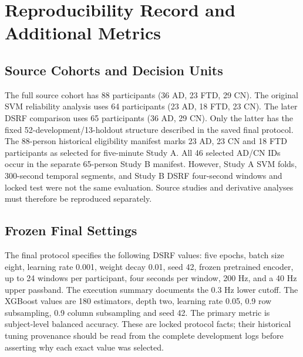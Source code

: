 \chapter{Reproducibility Record and Additional Metrics}
\label{app:reproducibility}
\section{Source Cohorts and Decision Units}
The full source cohort has 88 participants (36 AD, 23 FTD, 29 CN). The original SVM reliability analysis uses 64 participants (23 AD, 18 FTD, 23 CN). The later DSRF comparison uses 65 participants (36 AD, 29 CN). Only the latter has the fixed 52-development/13-holdout structure described in the saved final protocol. The 88-person historical eligibility manifest marks 23 AD, 23 CN and 18 FTD participants as selected for five-minute Study A. All 46 selected AD/CN IDs occur in the separate 65-person Study B manifest. However, Study A SVM folds, 300-second temporal segments, and Study B DSRF four-second windows and locked test were not the same evaluation. Source studies and derivative analyses must therefore be reproduced separately.

\section{Frozen Final Settings}
The final protocol specifies the following DSRF values: five epochs, batch size eight, learning rate 0.001, weight decay 0.01, seed 42, frozen pretrained encoder, up to 24 windows per participant, four seconds per window, 200 Hz, and a 40 Hz upper passband. The execution summary documents the 0.3 Hz lower cutoff. The XGBoost values are 180 estimators, depth two, learning rate 0.05, 0.9 row subsampling, 0.9 column subsampling and seed 42. The primary metric is subject-level balanced accuracy. These are locked protocol facts; their historical tuning provenance should be read from the complete development logs before asserting why each exact value was selected.

